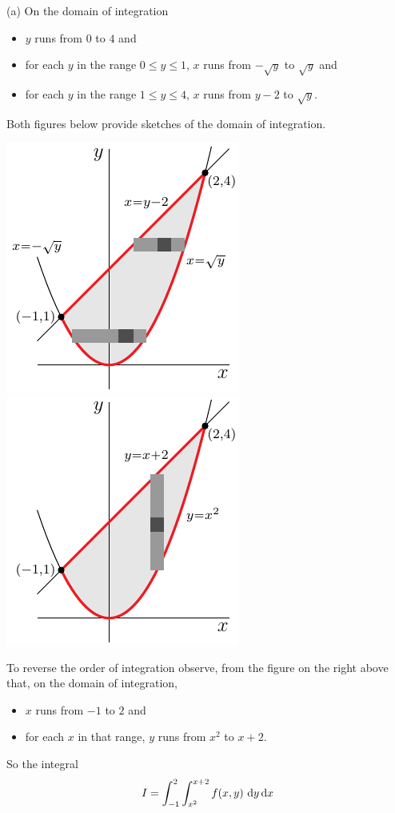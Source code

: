 \begin{solution}
(a)  On the domain of integration
\begin{itemize}
\item 
  $y$ runs from $0$ to $4$ and
\item
  for each $y$ in the range $0\le y\le 1$, $x$ runs from $-\sqrt{y}$ 
to $\sqrt{y}$ and
\item
  for each $y$ in the range $1\le y\le 4$, $x$ runs from $y-2$ 
to $\sqrt{y}$.
\end{itemize}
Both figures below provide sketches of the domain of integration.

\begin{center}
     \includegraphics{fig/OE12A_6a.pdf}\qquad
     \includegraphics{fig/OE12A_6b.pdf}
\end{center}

To reverse the order of integration observe, from the figure on the
right above that, on the domain of integration,
\begin{itemize}
\item 
  $x$ runs from $-1$ to $2$ and
\item
  for each $x$ in that range, $y$ runs from $x^2$ 
  to $x+2$.
\end{itemize}
So the integral
\begin{equation*}
I = \int_{-1}^2\int_{x^2}^{x+2} f(x,y)\ \mathrm{d}y\,\mathrm{d}x
\end{equation*}


\end{solution}
